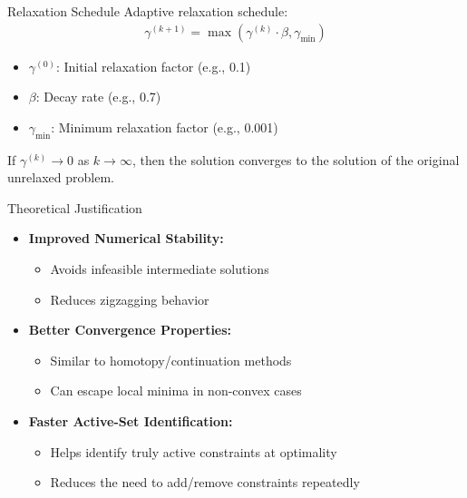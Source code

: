 \documentclass{beamer}
\begin{document}
\begin{frame}{Relaxation Schedule}
    Adaptive relaxation schedule:
    \begin{align}
        \gamma^{(k+1)} = \max(\gamma^{(k)} \cdot \beta, \gamma_{\min})
    \end{align}
    
    \begin{itemize}
        \item $\gamma^{(0)}$: Initial relaxation factor (e.g., 0.1)
        \item $\beta$: Decay rate (e.g., 0.7)
        \item $\gamma_{\min}$: Minimum relaxation factor (e.g., 0.001)
    \end{itemize}
    
    \begin{theorem}
        If $\gamma^{(k)} \to 0$ as $k \to \infty$, then the solution converges to the solution of the original unrelaxed problem.
    \end{theorem}
\end{frame}

\begin{frame}{Theoretical Justification}
    \begin{itemize}
        \item \textbf{Improved Numerical Stability:}
            \begin{itemize}
                \item Avoids infeasible intermediate solutions
                \item Reduces zigzagging behavior
            \end{itemize}
        \item \textbf{Better Convergence Properties:}
            \begin{itemize}
                \item Similar to homotopy/continuation methods
                \item Can escape local minima in non-convex cases
            \end{itemize}
        \item \textbf{Faster Active-Set Identification:}
            \begin{itemize}
                \item Helps identify truly active constraints at optimality
                \item Reduces the need to add/remove constraints repeatedly
            \end{itemize}
    \end{itemize}
\end{frame}
\end{document}
